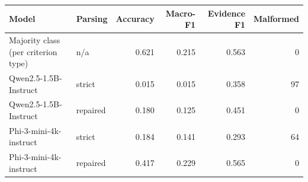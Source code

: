 \begin{tabular}{llrrrr}
\toprule
Model & Parsing & Accuracy & Macro-F1 & Evidence F1 & Malformed \\
\midrule
Majority class (per criterion type) & n/a & 0.621 & 0.215 & 0.563 & 0 \\
Qwen2.5-1.5B-Instruct & strict & 0.015 & 0.015 & 0.358 & 97 \\
Qwen2.5-1.5B-Instruct & repaired & 0.180 & 0.125 & 0.451 & 0 \\
Phi-3-mini-4k-instruct & strict & 0.184 & 0.141 & 0.293 & 64 \\
Phi-3-mini-4k-instruct & repaired & 0.417 & 0.229 & 0.565 & 0 \\
\bottomrule
\end{tabular}
